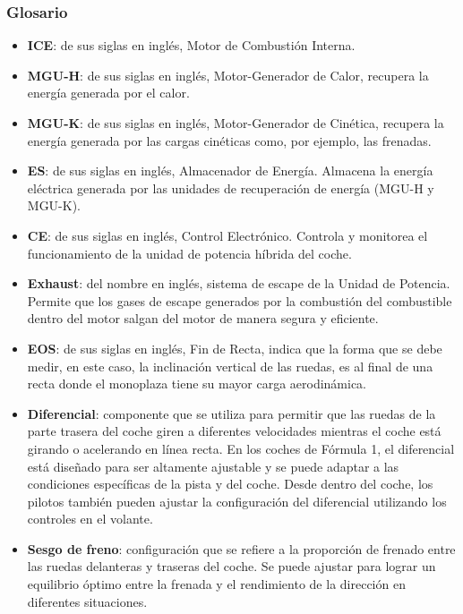 \documentclass[12pt,a4paper,twoside,spanish]{article}      %
\begin{document}
\subsubsection{Glosario}

\begin{itemize}
    \item \textbf{ICE}: de sus siglas en inglés, Motor de Combustión Interna.
    \item \textbf{MGU-H}: de sus siglas en inglés, Motor-Generador de Calor, recupera la energía generada por el calor.
    \item \textbf{MGU-K}: de sus siglas en inglés, Motor-Generador de Cinética, recupera la energía generada por las cargas cinéticas como, por ejemplo, las frenadas.
    \item \textbf{ES}: de sus siglas en inglés, Almacenador de Energía. Almacena la energía eléctrica generada por las unidades de recuperación de energía (MGU-H y MGU-K). 
    \item \textbf{CE}: de sus siglas en inglés, Control Electrónico. Controla y monitorea el funcionamiento de la unidad de potencia híbrida del coche.
    \item \textbf{Exhaust}: del nombre en inglés, sistema de escape de la Unidad de Potencia. Permite que los gases de escape generados por la combustión del combustible dentro del motor salgan del motor de manera segura y eficiente.
    \item \textbf{EOS}: de sus siglas en inglés, Fin de Recta, indica que la forma que se debe medir, en este caso, la inclinación vertical de las ruedas, es al final de una recta donde el monoplaza tiene su mayor carga aerodinámica.
    \item \textbf{Diferencial}: componente que se utiliza para permitir que las ruedas de la parte trasera del coche giren a diferentes velocidades mientras el coche está girando o acelerando en línea recta. En los coches de Fórmula 1, el diferencial está diseñado para ser altamente ajustable y se puede adaptar a las condiciones específicas de la pista y del coche. Desde dentro del coche, los pilotos también pueden ajustar la configuración del diferencial utilizando los controles en el volante.
    \item \textbf{Sesgo de freno}: configuración que se refiere a la proporción de frenado entre las ruedas delanteras y traseras del coche. Se puede ajustar para lograr un equilibrio óptimo entre la frenada y el rendimiento de la dirección en diferentes situaciones.
\end{itemize}
\end{document}
